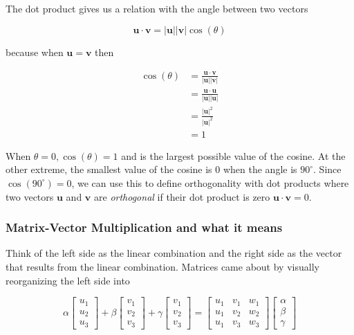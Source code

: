 \documentclass[main.tex]{subfiles}
\begin{document}
    The dot product gives us a relation with the angle between two vectors
    
    $$\mathbf{u} \cdot \mathbf{v}=|\mathbf{u}||\mathbf{v}| \cos (\theta)$$
    
    because when $\mathbf{u}=\mathbf{v}$ then 
    
    $$ \begin{aligned} \cos (\theta) &=\frac{\mathbf{u} \cdot \mathbf{v}}{|\mathbf{u}||\mathbf{v}|} \\
    &=\frac{\mathbf{u} \cdot \mathbf{u}}{|\mathbf{u}||\mathbf{u}|} \\
    &=\frac{|\mathbf{u}|^{2}}{|\mathbf{u}|^{2}} \\
    &=1
    \end{aligned}$$
    
    When $\theta=0, \cos (\theta)=1$ and is the largest possible value of the cosine. At the other extreme, the smallest value of the cosine is $0$ when the angle is $90^\circ$. Since $\cos \left(90^{\circ}\right)=0$, we can use this to define orthogonality with dot products where two vectors $\mathbf{u}$ and $\mathbf{v}$ are \textit{orthogonal} if their dot product is zero $\mathbf{u} \cdot \mathbf{v}=0$.
    
    \subsubsection{Matrix-Vector Multiplication and what it means}
    
    Think of the left side as the linear combination and the right side as the vector that results from the linear combination. Matrices came about by visually reorganizing the left side into 
    
    $$\alpha\left[\begin{array}{l}u_{1} \\ u_{2} \\ u_{3}\end{array}\right]+\beta\left[\begin{array}{l}v_{1} \\ v_{2} \\ v_{3}\end{array}\right]+\gamma\left[\begin{array}{l}v_{1} \\ v_{2} \\ v_{3}\end{array}\right]=\left[\begin{array}{lll}u_{1} & v_{1} & w_{1} \\ u_{1} & v_{2} & w_{2} \\ u_{1} & v_{3} & w_{3}\end{array}\right]\left[\begin{array}{l}\alpha \\ \beta \\ \gamma\end{array}\right]$$
    
\end{document}
